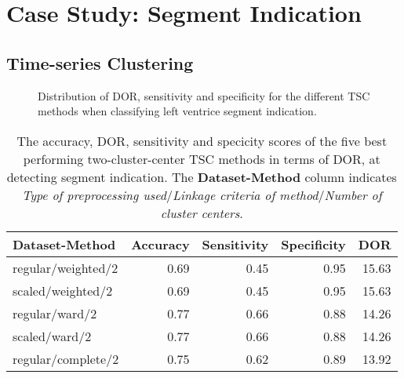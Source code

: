 \section{Case Study: Segment Indication}

\subsection{Time-series Clustering}

\begin{figure}[htb]
    \centering
    
    \caption{Distribution of DOR, sensitivity and specificity for the different TSC methods when classifying left ventrice segment indication.}
    \label{fig:tsc_segm_ind_dor_sens_spec_dist}
\end{figure}

\begin{table*}[htb]
    \centering
    \begin{tabular}{lrrrr}
        \toprule
        Dataset-Method     &  Accuracy &  Sensitivity &  Specificity &  DOR \\
        \midrule
        regular/weighted/2 &      0.69 &         0.45 &         0.95 & 15.63 \\
        scaled/weighted/2  &      0.69 &         0.45 &         0.95 & 15.63 \\
        regular/ward/2     &      0.77 &         0.66 &         0.88 & 14.26 \\
        scaled/ward/2      &      0.77 &         0.66 &         0.88 & 14.26 \\
        regular/complete/2 &      0.75 &         0.62 &         0.89 & 13.92 \\
        \bottomrule
    \end{tabular}
    \caption{The accuracy, DOR, sensitivity and specicity scores of the five best performing two-cluster-center TSC methods in terms of DOR, at detecting segment indication.
             The \textbf{Dataset-Method} column indicates \textit{Type of preprocessing used}$/$\textit{Linkage criteria of method}$/$\textit{Number of cluster centers}.}
    \label{tab:tsc_segm_ind_dor_sens_spec_dist}
\end{table*}

